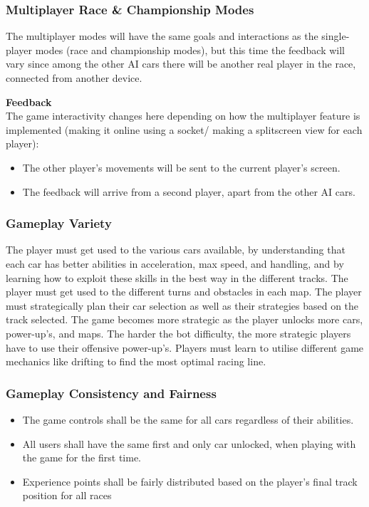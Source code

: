 \documentclass[12pt]{article}
\begin{document}
\subsubsection{Multiplayer Race \& Championship Modes}

The multiplayer modes will have the same goals and interactions as the single-player modes (race and championship modes), but this time the feedback will vary since among the other AI cars there will be another real player in the race, connected from another device.

\noindent\textbf{Feedback}\\
The game interactivity changes here depending on how the multiplayer feature is implemented (making it online using a socket/ making a splitscreen view for each player):
\begin{itemize}
\item The other player’s movements will be sent to the current player’s screen.
\item The feedback will arrive from a second player, apart from the other AI cars.
\end{itemize}

\subsubsection{Gameplay Variety}

The player must get used to the various cars available, by understanding that each car has better abilities in acceleration, max speed, and handling, and by learning how to exploit these skills in the best way in the different tracks. The player must get used to the different turns and obstacles in each map. The player must strategically plan their car selection as well as their strategies based on the track selected. The game becomes more strategic as the player unlocks more cars, power-up’s, and maps. The harder the bot difficulty, the more strategic players have to use their offensive power-up’s. Players must learn to utilise different game mechanics like drifting to find the most optimal racing line.

\subsubsection{Gameplay Consistency and Fairness}

\begin{itemize}
\item The game controls shall be the same for all cars regardless of their abilities.
\item All users shall have the same first and only car unlocked, when playing with the game for the first time.
\item Experience points shall be fairly distributed based on the player’s final track position for all races
\end{itemize}
\end{document}
